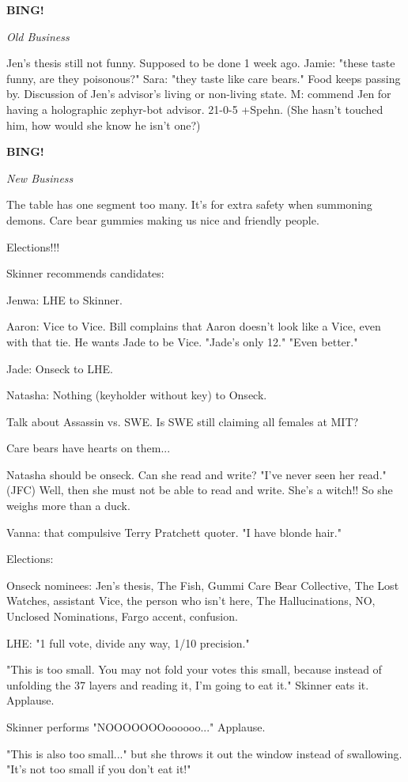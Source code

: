\documentclass[12pt]{article}
\newcommand{\bing}{{\bf BING!} }
\newcommand{\goto}[1]{\bing \vskip 12pt \centerline{{\em{#1}}}}
\begin{document}
\goto{Old Business}

Jen's thesis still not funny. Supposed to be done 1 week ago.
Jamie: "these taste funny, are they poisonous?"
Sara: "they taste like care bears."
Food keeps passing by.
Discussion of Jen's advisor's living or non-living state.
M: commend Jen for having a holographic zephyr-bot advisor. 21-0-5 +Spehn.
(She hasn't touched him, how would she know he isn't one?)

\goto{New Business}

The table has one segment too many.
It's for extra safety when summoning demons.
Care bear gummies making us nice and friendly people.

Elections!!!

Skinner recommends candidates:

Jenwa: LHE to Skinner.

Aaron: Vice to Vice. Bill complains that Aaron doesn't look like a Vice, even with that tie. He wants Jade to be Vice. "Jade's only 12." "Even better."

Jade: Onseck to LHE.

Natasha: Nothing (keyholder without key) to Onseck.

Talk about Assassin vs. SWE. Is SWE still claiming all females at MIT?

Care bears have hearts on them...

Natasha should be onseck. Can she read and write? "I've never seen her read." (JFC) Well, then she must not be able to read and write. She's a witch!! So she weighs more than a duck.

Vanna: that compulsive Terry Pratchett quoter. "I have blonde hair."

Elections: 

Onseck nominees: Jen's thesis, The Fish, Gummi Care Bear Collective, The Lost Watches, assistant Vice, the person who isn't here, The Hallucinations, NO, Unclosed Nominations, Fargo accent, confusion.

LHE: "1 full vote, divide any way, 1/10 precision."

"This is too small. You may not fold your votes this small, because instead of unfolding the 37 layers and reading it, I'm going to eat it." Skinner eats it. Applause.

Skinner performs "NOOOOOOOoooooo..." Applause.

"This is also too small..." but she throws it out the window instead of swallowing. "It's not too small if you don't eat it!"
\end{document}
